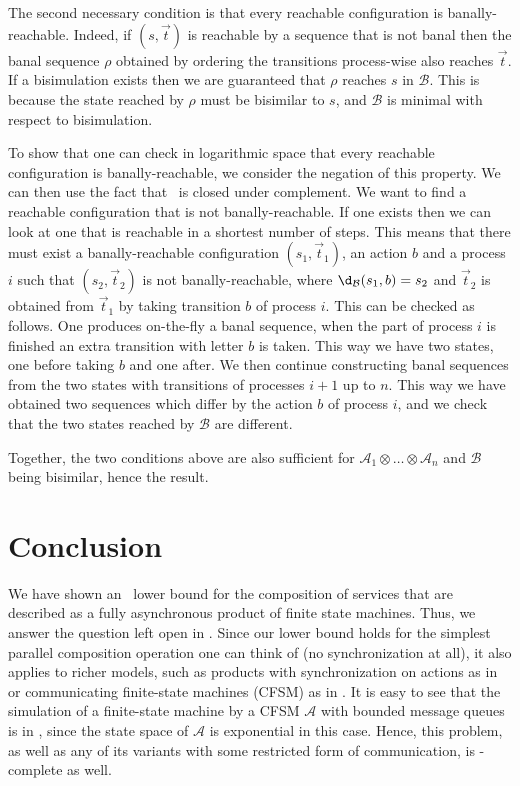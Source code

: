 \documentclass{LMCS}
\theoremstyle{plain}\newtheorem{remark}{Remark}
\theoremstyle{plain}\newtheorem{lemma}[thm]{Lemma}
\renewcommand{\Aa}{\mathcal{A}}
\renewcommand{\Bb}{\mathcal{B}}
\newcommand{\vect}{\vec t}
\newcommand{\vAa}{\Aa_1\otimes\dots\otimes\Aa_n}
\begin{document}
The second necessary condition is that every reachable configuration
is banally-reachable. Indeed, if $(s,\vect)$ is reachable by a
sequence that is not banal then the banal sequence $\rho$ obtained by
ordering the transitions process-wise also reaches
$\vect$. If a bisimulation exists then we are
guaranteed that $\rho$ reaches $s$ in $\Bb$.  This is because the state
reached by $\rho$ must be bisimilar to $s$, and $\Bb$ is minimal with
respect to bisimulation.

To show that one can check in logarithmic space that every reachable
configuration is banally-reachable, we consider
the negation of this property. We can then use the fact that
\LOGSPACE\ is closed under complement. We want to find a reachable
configuration that is not banally-reachable. If one exists then we can
look at one that is reachable in a shortest number of steps. This
means that there must exist a banally-reachable configuration
$(s_1,\vect_1)$, an action $b$ and a process $i$ such that
$(s_2,\vect_2)$ is not banally-reachable, where $\d_\Bb(s_1,b)= s_2$
and $\vect_2$ is obtained from $\vect_1$ by taking transition $b$ of
process $i$. This can be checked as follows. One produces on-the-fly a
banal sequence, when the part of process $i$ is finished an extra
transition with letter $b$ is taken. This way we have two states, one
before taking $b$ and one after. We then continue constructing banal
sequences from the two states with transitions of processes $i+1$ up
to $n$. This way we have obtained two sequences which differ by the
action $b$ of process $i$, and we check that the two states reached by
$\Bb$ are different.

Together, the two conditions above are also sufficient for $\vAa$ and
$\Bb$ being bisimilar, hence the result.



\section{Conclusion}

We have shown an \EXPTIME\ lower bound for the composition of
services that are described as a fully asynchronous product of finite state
machines. Thus, we answer the question left open in \cite{BCGLM03}. 
Since our lower bound holds for the simplest parallel composition
operation one can think of (no synchronization at all), it also
applies to richer models, such as products with synchronization on
actions as in \cite{LarSch00} or communicating finite-state machines
(CFSM) as in \cite{hbcs03,fbs04}. It is easy to see that the
simulation of a finite-state machine by a CFSM $\Aa$ with bounded
message queues is in \EXPTIME, since the state space of $\Aa$ is
exponential in this case. Hence, this problem, as well as any of its
variants with some restricted form of communication, is
\EXPTIME-complete as well.
\end{document}
